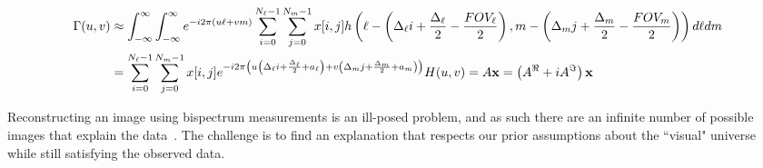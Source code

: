 \begin{figure}[!t]
	\normalsize
	\setcounter{equation}{5}
	{\small
		\begin{align}
		\notag \Gamma(u,v) &\approx \int_{- \infty}^{\infty}\int_{- \infty}^{\infty} {e^{-i 2 \pi  (u\ell + vm) }} \sum_{i=0}^{N_\ell-1}\sum_{j=0}^{N_m-1} x[i,j] 
		h \left(\ell- \left( \Delta_{\ell}i + \frac{\Delta_{\ell}}{2}  -\frac{FOV_\ell}{2} \right),m- \left( \Delta_mj + \frac{\Delta_m}{2} -\frac{FOV_m}{2} \right) \right)  d\ell dm  
		\\ &=  \sum_{i=0}^{N_\ell-1}{\sum_{j=0}^{N_m-1}  x[i,j] e^{-i 2 \pi \left(u  \left( \Delta_{\ell}i + \frac{\Delta_{\ell}}{2} + a_\ell \right) + v \left( \Delta_mj + \frac{\Delta_m}{2} + a_m \right)  \right)} H(u, v)} = A {\bf x} = \left( A^{\Re} + i A^{\Im} \right) {\bf x}
		\label{eq:formodel}
		\end{align} 
	}
	\vspace{-.25in}
	\hrulefill
\end{figure}


Reconstructing an image using bispectrum measurements is an ill-posed problem, and as such there are an infinite number of possible images that explain the data~\cite{rusenimaging}. 
The challenge is to find an explanation that respects our prior assumptions about the ``visual" universe
while still satisfying the observed data. 





